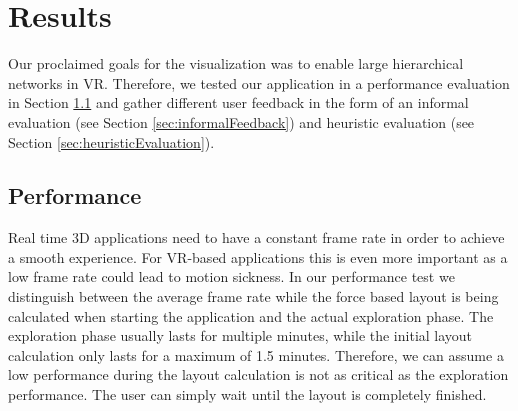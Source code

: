 \chapter{Results}

Our proclaimed goals for the visualization was to enable large hierarchical networks in VR. 
Therefore, we tested our application in a performance evaluation in Section \ref{sec:performanceEvaluation} and gather different user feedback in the form of an informal evaluation (see Section \ref{sec:informalFeedback}) and heuristic evaluation (see Section \ref{sec:heuristicEvaluation}).

\section{Performance}
\label{sec:performanceEvaluation}

Real time 3D applications need to have a constant frame rate in order to achieve a smooth experience.
For VR-based applications this is even more important as a low frame rate could lead to motion sickness. 
In our performance test we distinguish between the average frame rate while the force based layout is being calculated when starting the application and the actual exploration phase. 
The exploration phase usually lasts for multiple minutes, while the initial layout calculation only lasts for a maximum of 1.5 minutes.
Therefore, we can assume a low performance during the layout calculation is not as critical as the exploration performance. 
The user can simply wait until the layout is completely finished.

